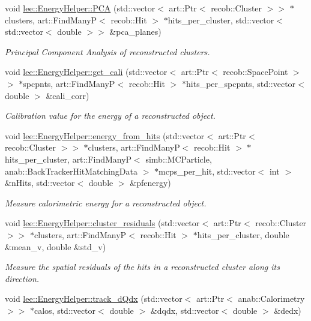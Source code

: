 \begin{DoxyCompactItemize}
void \hyperlink{group__lee_gac5f41d2b1bee9a0f761179f3059f8a49}{lee\-::\-Energy\-Helper\-::\-P\-C\-A} (std\-::vector$<$ art\-::\-Ptr$<$ recob\-::\-Cluster $>$$>$ $\ast$clusters, art\-::\-Find\-Many\-P$<$ recob\-::\-Hit $>$ $\ast$hits\-\_\-per\-\_\-cluster, std\-::vector$<$ std\-::vector$<$ double $>$$>$ \&pca\-\_\-planes)
\begin{DoxyCompactList}\small\item\em Principal Component Analysis of reconstructed clusters. \end{DoxyCompactList}\item 
void \hyperlink{group__lee_gaf141846d9be1716bcfcf351633bdf8e7}{lee\-::\-Energy\-Helper\-::get\-\_\-cali} (std\-::vector$<$ art\-::\-Ptr$<$ recob\-::\-Space\-Point $>$$>$ $\ast$spcpnts, art\-::\-Find\-Many\-P$<$ recob\-::\-Hit $>$ $\ast$hits\-\_\-per\-\_\-spcpnts, std\-::vector$<$ double $>$ \&cali\-\_\-corr)
\begin{DoxyCompactList}\small\item\em Calibration value for the energy of a reconstructed object. \end{DoxyCompactList}\item 
void \hyperlink{group__lee_ga974439f9a96ce4a0e022e5e2e7d5e633}{lee\-::\-Energy\-Helper\-::energy\-\_\-from\-\_\-hits} (std\-::vector$<$ art\-::\-Ptr$<$ recob\-::\-Cluster $>$$>$ $\ast$clusters, art\-::\-Find\-Many\-P$<$ recob\-::\-Hit $>$ $\ast$hits\-\_\-per\-\_\-cluster, art\-::\-Find\-Many\-P$<$ simb\-::\-M\-C\-Particle, anab\-::\-Back\-Tracker\-Hit\-Matching\-Data $>$ $\ast$mcps\-\_\-per\-\_\-hit, std\-::vector$<$ int $>$ \&n\-Hits, std\-::vector$<$ double $>$ \&pfenergy)
\begin{DoxyCompactList}\small\item\em Measure calorimetric energy for a reconstructed object. \end{DoxyCompactList}\item 
void \hyperlink{group__lee_ga01205d4a5d2f8d5ad0d4d5462e0b7563}{lee\-::\-Energy\-Helper\-::cluster\-\_\-residuals} (std\-::vector$<$ art\-::\-Ptr$<$ recob\-::\-Cluster $>$$>$ $\ast$clusters, art\-::\-Find\-Many\-P$<$ recob\-::\-Hit $>$ $\ast$hits\-\_\-per\-\_\-cluster, double \&mean\-\_\-v, double \&std\-\_\-v)
\begin{DoxyCompactList}\small\item\em Measure the spatial residuals of the hits in a reconstructed cluster along its direction. \end{DoxyCompactList}\item 
void \hyperlink{group__lee_ga27cd9ba04f447b9922c56bbb320bce08}{lee\-::\-Energy\-Helper\-::track\-\_\-d\-Qdx} (std\-::vector$<$ art\-::\-Ptr$<$ anab\-::\-Calorimetry $>$$>$ $\ast$calos, std\-::vector$<$ double $>$ \&dqdx, std\-::vector$<$ double $>$ \&dedx)

\end{DoxyCompactItemize}
